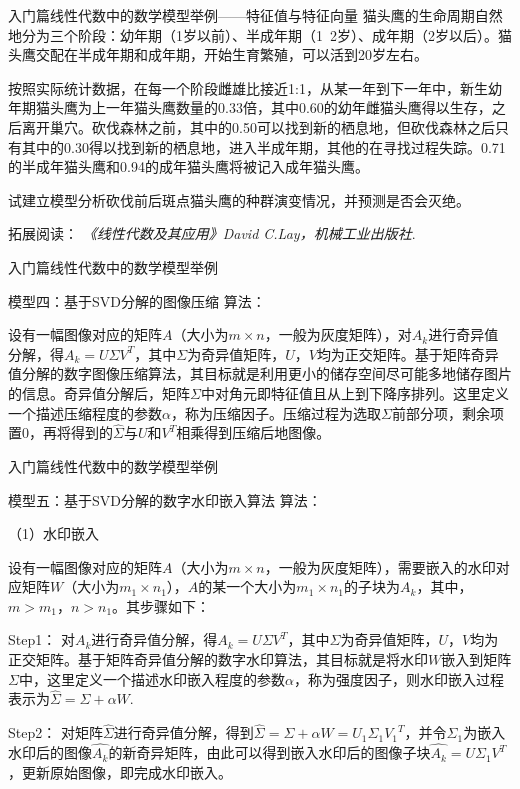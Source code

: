 \documentclass{beamer}
\begin{document}
\begin{frame}{入门篇}{线性代数中的数学模型举例——特征值与特征向量}
猫头鹰的生命周期自然地分为三个阶段：幼年期（1岁以前）、半成年期（1~2岁）、成年期（2岁以后）。猫头鹰交配在半成年期和成年期，开始生育繁殖，可以活到20岁左右。

按照实际统计数据，在每一个阶段雌雄比接近1:1，从某一年到下一年中，新生幼年期猫头鹰为上一年猫头鹰数量的0.33倍，其中0.60的幼年雌猫头鹰得以生存，之后离开巢穴。砍伐森林之前，其中的0.50可以找到新的栖息地，但砍伐森林之后只有其中的0.30得以找到新的栖息地，进入半成年期，其他的在寻找过程失踪。0.71的半成年猫头鹰和0.94的成年猫头鹰将被记入成年猫头鹰。

试建立模型分析砍伐前后斑点猫头鹰的种群演变情况，并预测是否会灭绝。

\footnotesize 拓展阅读：
\emph{《线性代数及其应用》David C.Lay，机械工业出版社}.
\end{frame}

\begin{frame}{入门篇}{线性代数中的数学模型举例}
\begin{block}{模型四：基于SVD分解的图像压缩}
算法：

设有一幅图像对应的矩阵$A$（大小为$m\times n$，一般为灰度矩阵），对$A_k$进行奇异值分解，得$A_k=U{\Sigma}V^T$，其中$\Sigma$为奇异值矩阵，$U$，$V$均为正交矩阵。基于矩阵奇异值分解的数字图像压缩算法，其目标就是利用更小的储存空间尽可能多地储存图片的信息。奇异值分解后，矩阵$\Sigma$中对角元即特征值且从上到下降序排列。这里定义一个描述压缩程度的参数$\alpha$，称为压缩因子。压缩过程为选取$\Sigma$前部分项，剩余项置0，再将得到的$\hat{\Sigma}$与$U$和$V^T$相乘得到压缩后地图像。
\end{block}
\end{frame}

\begin{frame}{入门篇}{线性代数中的数学模型举例}
\begin{block}{模型五：基于SVD分解的数字水印嵌入算法}
算法：

{\color{blue} （1）水印嵌入}

设有一幅图像对应的矩阵$A$（大小为$m\times n$，一般为灰度矩阵），需要嵌入的水印对应矩阵$W$（大小为$m_1 \times n_1$），$A$的某一个大小为$m_1 \times n_1$的子块为$A_k$，其中，$m>m_1$，$n>n_1$。其步骤如下：

{\color{blue} Step1：}
对$A_k$进行奇异值分解，得$A_k=U{\Sigma}V^T$，其中$\Sigma$为奇异值矩阵，$U$，$V$均为正交矩阵。基于矩阵奇异值分解的数字水印算法，其目标就是将水印$W$嵌入到矩阵$\Sigma$中，这里定义一个描述水印嵌入程度的参数$\alpha$，称为强度因子，则水印嵌入过程表示为$\hat{\Sigma}=\Sigma+\alpha W$.

{\color{blue} Step2：}
对矩阵$\hat{\Sigma}$进行奇异值分解，得到$\hat{\Sigma}=\Sigma+\alpha W=U_1 {\Sigma}_1 {V_1}^T$，并令${\Sigma}_1$为嵌入水印后的图像$\hat{A_k}$的新奇异矩阵，由此可以得到嵌入水印后的图像子块$\hat{A_k}=U \Sigma_1 V^T$，更新原始图像，即完成水印嵌入。
\end{block}
\end{frame}
\end{document}

